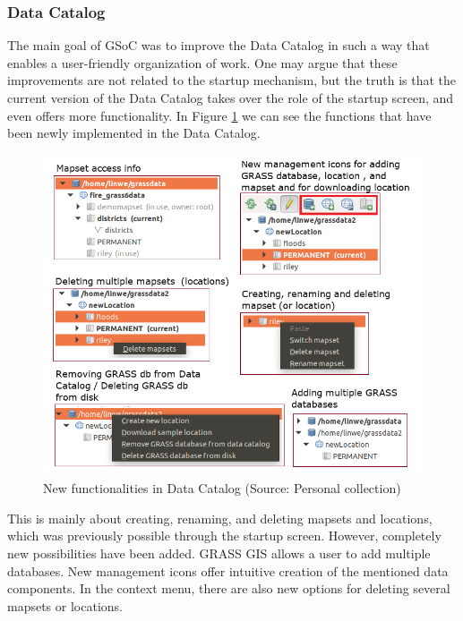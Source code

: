 \documentclass[a4paper,10pt,twoside]{article}
\begin{document}
\newpage
\vspace*{-1cm}
\subsubsection{Data Catalog}

The main goal of GSoC was to improve the Data Catalog in such a way that enables a user-friendly organization of work. One may argue that these improvements are not related to the startup mechanism, but the truth is that the current version of the Data Catalog takes over the role of the startup screen, and even offers more functionality. In Figure \ref{fig:function} we can see the functions that have been newly implemented in the Data Catalog.

\vspace{0.3cm}
\begin{figure}[hbt!] 
\begin{center}
\includegraphics[width=15cm]{../pictures/funkce.png} 
\caption[New functionalities in Data Catalog ]{New functionalities in Data Catalog (Source: Personal collection)}
\label{fig:function}
\end{center}
\end{figure}

\noindent This is mainly about creating, renaming, and deleting mapsets and locations, which was previously possible through the startup screen. However, completely new possibilities have been added. GRASS GIS allows a user to add multiple databases. New management icons offer intuitive creation of the mentioned data components. In the context menu, there are also new options for deleting several mapsets or locations.
\end{document}
